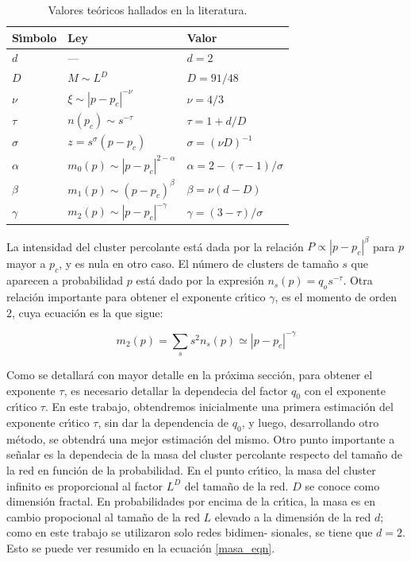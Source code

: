 \documentclass[
 reprint,
 amsmath,amssymb,
 aps,
]{revtex4-1}
\begin{document}
\begin{table}[h]
\caption{\label{valores_teoricos}
Valores te\'oricos hallados en la literatura.
}
\begin{ruledtabular}
\begin{tabular}{lll}
\\[-5pt]
 S\'\i mbolo     & Ley                        & Valor                          \\
\hline
$d$             &   ---                         & $d=2$                        \\
$D$             & $M\sim L^{D}$                 & $D=91/48$                    \\
$\nu$           & $\xi\sim|p-p_c|^{-\nu}$       & $\nu=4/3$                    \\
$\tau$          & $n(p_c)\sim s^{-\tau}$        & $\tau=1+d/D$                 \\
$\sigma$        & $z=s^\sigma(p-p_c)$           & $\sigma=(\nu D)^{-1}$        \\
$\alpha$        & $m_0(p)\sim|p-p_c|^{2-\alpha}$& $\alpha=2-(\tau-1)/\sigma$   \\
$\beta$         & $m_1(p)\sim(p-p_c)^\beta$     & $\beta=\nu(d-D)$             \\
$\gamma$        & $m_2(p)\sim|p-p_c|^{-\gamma}$ & $\gamma=(3-\tau)/\sigma$     \\
\end{tabular}
\end{ruledtabular}
\end{table}

La intensidad del cluster percolante est\'a dada por la relaci\'on $P \propto |p - p_c|^\beta$ para $p$ mayor a $p_c$, y es nula en otro caso. El n\'umero de clusters de tama\~no $s$ que aparecen a probabilidad $p$ est\'a dado por la expresi\'on $n_s(p) = q_o s^{-\tau}$. Otra relaci\'on importante para obtener el exponente cr\'\i tico $\gamma$, es el momento de orden 2, cuya ecuaci\'on es la que sigue:

\begin{equation}\label{momento_2_gamma}
    m_2(p) = \sum_s s^2n_s(p) \simeq | p - p_c |^{-\gamma}
\end{equation}


Como se detallar\'a con mayor detalle en la pr\'oxima secci\'on, para obtener el exponente $\tau$, es necesario detallar la dependecia del factor $q_0$ con el exponente cr\'\i tico $\tau$. En este trabajo, obtendremos inicialmente una primera estimaci\'on del exponente cr\'\i tico $\tau$, sin dar la dependencia de $q_0$, y luego, desarrollando otro m\'etodo, se obtendr\'a una mejor estimaci\'on del mismo. Otro punto importante a se\~nalar es la dependecia de la masa del cluster percolante respecto del tama\~no de la red en funci\'on de la probabilidad. En el punto cr\'\i tico, la masa del cluster infinito es proporcional al factor $L^D$ del tama\~no de la red. $D$ se conoce como dimensi\'on fractal. En probabilidades por encima de la cr\'\i tica, la masa es en cambio propocional al tama\~no de la red $L$ elevado a la dimensi\'on de la red $d$; como en este trabajo se utilizaron solo redes bidimen- sionales, se tiene que $d = 2$. Esto se puede ver resumido en la ecuaci\'on \ref{masa_eqn}.
\end{document}
